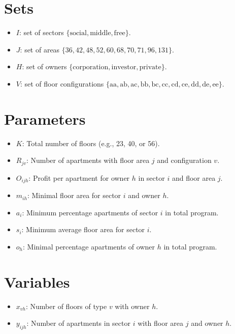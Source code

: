 \documentclass{article}
\begin{document}
\section{Sets}
\begin{itemize}[leftmargin=*,nosep]
    \item $I$: set of sectors $\{\text{social}, \text{middle}, \text{free}\}$.
    \item $J$: set of areas $\{36, 42, 48, 52, 60, 68, 70, 71, 96, 131\}$.
    \item $H$: set of owners $\{\text{corporation}, \text{investor}, \text{private}\}$.
    \item $V$: set of floor configurations $\{\text{aa}, \text{ab}, \text{ac}, \text{bb}, \text{bc}, \text{cc}, \text{cd}, \text{ce}, \text{dd}, \text{de}, \text{ee}\}$.
\end{itemize}

\section{Parameters}
\begin{itemize}[leftmargin=*,nosep]
    \item $K$: Total number of floors (e.g., 23, 40, or 56).
    \item $R_{jv}$: Number of apartments with floor area $j$ and configuration $v$.
    \item $O_{ijh}$: Profit per apartment for owner $h$ in sector $i$ and floor area $j$.
    \item $m_{ih}$: Minimal floor area for sector $i$ and owner $h$.
    \item $a_i$: Minimum percentage apartments of sector $i$ in total program.
    \item $s_i$: Minimum average floor area for sector $i$.
    \item $o_h$: Minimal percentage apartments of owner $h$ in total program.
\end{itemize}

\section{Variables}
\begin{itemize}[leftmargin=*,nosep]
\item     $x_{vh}$: Number of floors of type $v$ with owner $h$.
    \item $y_{ijh}$: Number of apartments in sector $i$ with floor area $j$ and owner $h$.
\end{itemize}
\end{document}
